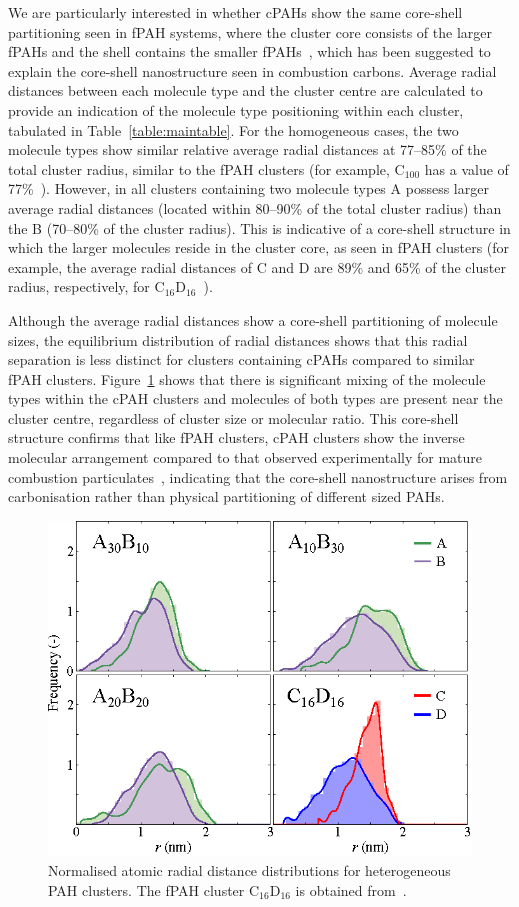 We are particularly interested in whether cPAHs show the same core-shell partitioning seen in fPAH systems, where the cluster core consists of the larger fPAHs and the shell contains the smaller fPAHs~\cite{bowal2018partitioning}, which has been suggested to explain the core-shell nanostructure seen in combustion carbons. Average radial distances between each molecule type and the cluster centre are calculated to provide an indication of the molecule type positioning within each cluster, tabulated in  Table~\ref{table:maintable}. For the homogeneous cases, the two molecule types show similar relative average radial distances at 77--85\% of the total cluster radius, similar to the fPAH clusters (for example, $\text{C}_{\text{100}}$ has a value of 77\%~\cite{chen2014size}). However, in all clusters containing two molecule types A possess larger average radial distances (located within 80--90\% of the total cluster radius) than the B (70--80\% of the cluster radius). This is indicative of a core-shell structure in which the larger molecules reside in the cluster core, as seen in fPAH clusters (for example, the average radial distances of C and D are 89\% and 65\% of the cluster radius, respectively, for $\text{C}_{\text{16}}\text{D}_{\text{16}}$~\cite{bowal2018partitioning}). 

Although the average radial distances show a core-shell partitioning of molecule sizes, the equilibrium distribution of radial distances shows that this radial separation is less distinct for clusters containing cPAHs compared to similar fPAH clusters. Figure~\ref{fig:radialdists_atomic} shows that there is significant mixing of the molecule types within the cPAH clusters and molecules of both types are present near the cluster centre, regardless of cluster size or molecular ratio. This core-shell structure confirms that like fPAH clusters, cPAH clusters show the inverse molecular arrangement compared to that observed experimentally for mature combustion particulates~\cite{botero2019internal}, indicating that the core-shell nanostructure arises from carbonisation rather than physical partitioning of different sized PAHs.
%
\begin{figure}[!tbh]
\centering
\includegraphics[width=0.6\linewidth]{Figures/radii_histograms_aa.eps}
\caption{Normalised atomic radial distance distributions for heterogeneous PAH clusters. The fPAH cluster $\text{C}_{\text{16}}\text{D}_{\text{16}}$ is obtained from~\citet{bowal2018partitioning}.}
\label{fig:radialdists_atomic}
\end{figure}
%

